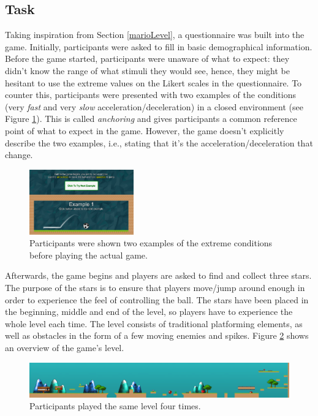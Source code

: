 \subsection{Task} \label{task}
Taking inspiration from Section \ref{marioLevel}, a questionnaire was built into the game. Initially, participants were asked to fill in basic demographical information. Before the game started, participants were unaware of what to expect: they didn't know the range of what stimuli they would see, hence, they might be hesitant to use the extreme values on the Likert scales in the questionnaire. To counter this, participants were presented with two examples of the conditions (very \textit{fast} and very \textit{slow} acceleration/deceleration) in a closed environment (see Figure \ref{fig:example}). This is called \textit{anchoring} \cite{cunningham} and gives participants a common reference point of what to expect in the game. However, the game doesn't explicitly describe the two examples, i.e., stating that it's the acceleration/deceleration that change.

\begin{figure}[htbp]
\centering
\includegraphics[width=0.4\textwidth]{Pics/example}
\caption{Participants were shown two examples of the extreme conditions before playing the actual game.}
\label{fig:example}
\end{figure}

Afterwards, the game begins and players are asked to find and collect three stars. The purpose of the stars is to ensure that players move/jump around enough in order to experience the feel of controlling the ball. The stars have been placed in the beginning, middle and end of the level, so players have to experience the whole level each time. The level consists of traditional platforming elements, as well as obstacles in the form of a few moving enemies and spikes. Figure \ref{fig:level} shows an overview of the game's level.

\begin{figure}[htbp]
\centering
\includegraphics[width=1\textwidth]{Pics/levelStructure}
\caption{Participants played the same level four times.}
\label{fig:level}
\end{figure}


